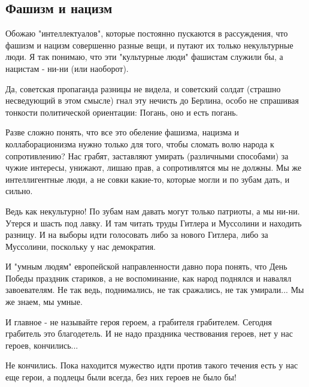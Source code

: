  
 

\subsection{Фашизм и нацизм}


Обожаю "интеллектуалов", которые постоянно пускаются в рассуждения, что фашизм
и нацизм совершенно разные вещи, и путают их только некультурные люди. Я так
понимаю, что эти "культурные люди" фашистам служили бы, а нацистам - ни-ни (или
наоборот). 

Да, советская пропаганда разницы не видела, и советский солдат (страшно
несведующий в этом смысле) гнал эту нечисть до Берлина, особо не спрашивая
тонкости политической ориентации: Погань, оно и есть погань. 

Разве сложно понять, что все это обеление фашизма, нацизма и коллаборационизма
нужно только для того, чтобы сломать волю народа к сопротивлению? Нас грабят,
заставляют умирать (различными способами) за чужие интересы, унижают, лишаю
прав, а сопротивлятся мы не должны. Мы же интеллигентные люди, а не совки
какие-то, которые могли и по зубам дать, и сильно. 

Ведь как некультурно! По зубам нам давать могут только патриоты, а мы ни-ни.
Утерся и шасть под лавку. И там читать труды Гитлера и Муссолини и находить
разницу. И на выборы идти голосовать либо за нового Гитлера, либо за Муссолини,
поскольку у нас демократия. 

И "умным людям" европейской направленности давно пора понять, что День Победы
праздник стариков, а не воспоминание, как народ поднялся и навалял
завоевателям. Не так ведь, поднимались, не так сражались, не так умирали... Мы
же знаем, мы умные. 

И главное - не называйте героя героем, а грабителя грабителем. Сегодня
грабитель это благодетель. И не надо праздника чествования героев, нет у
нас героев, кончились... 

Не кончились. Пока находится мужество идти против такого течения есть у
нас еще герои, а подлецы были всегда, без них героев не было бы!
